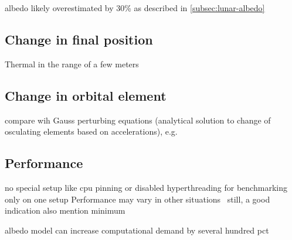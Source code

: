 albedo likely overestimated by 30\% as described in \cref{subsec:lunar-albedo}



\subsection{Change in final position}

Thermal in the range of a few meters ~\cite{Mazarico2011}


\subsection{Change in orbital element}

compare wih Gauss perturbing equations (analytical solution to change of osculating elements based on accelerations), e.g. ~\cite[Sec.~3.2]{Lucchesi2006}




\subsection{Performance}
no special setup like cpu pinning or disabled hyperthreading for benchmarking
only on one setup
Performance may vary in other situations~\cite{Mytkowicz2009}
still, a good indication
also mention minimum

albedo model can increase computational demand by several hundred pct \cite{Nicholson2010}

